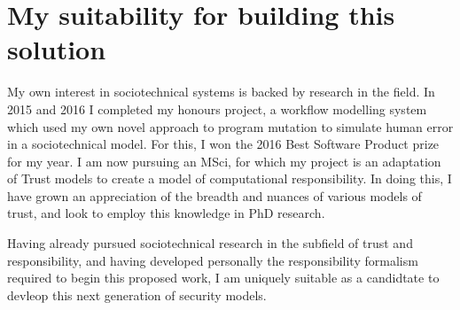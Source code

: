 \documentclass{tufte-handout}
\begin{document}
\section{My suitability for building this solution}
My own interest in sociotechnical systems is backed by research in the field. In 2015 and 2016 I completed my honours project, a workflow modelling system which used my own novel approach to program mutation to simulate human error in a sociotechnical model. For this, I won the 2016 Best Software Product prize for my year. I am now pursuing an MSci, for which my project is an adaptation of Trust models to create a model of computational responsibility. In doing this, I have grown an appreciation of the breadth and nuances of various models of trust, and look to employ this knowledge in PhD research.\par

Having already pursued sociotechnical research in the subfield of trust and responsibility, and having developed personally the responsibility formalism required to begin this proposed work, I am uniquely suitable as a candidtate to devleop this next generation of security models. 

\listoftodos[Things To Do]


\end{document}
